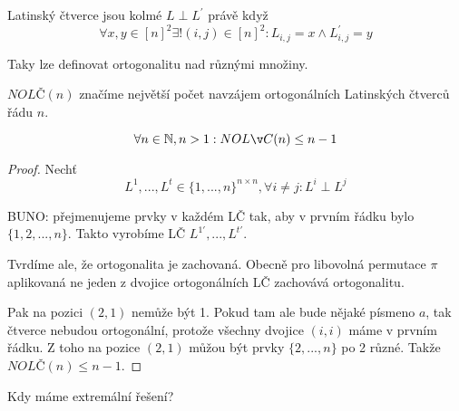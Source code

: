 \begin{definition}
	Latinský čtverce jsou kolmé $L \perp L^{\prime}$ právě když
	\[ \forall x,y \in [n]^2 \exists ! (i,j) \in [n]^2: L_{i,j} = x \land L_{i,j}^{\prime} = y \]

	Taky lze definovat ortogonalitu nad různými množiny.
\end{definition}

\begin{notation}
	$NOLČ(n)$ značíme největší počet navzájem ortogonálních Latinských čtverců řádu $n$.
\end{notation}

\begin{theorem}\label{nolc_lower0}
	\[\forall n \in \N, n > 1: NOLČ(n) \leq n - 1 \]
\end{theorem}
\begin{proof}
	Nechť
	\[L^1, ..., L^t \in \{ 1, ..., n \}^{n \times n}, \forall i \neq j: L^i \perp L^j \]

	BUNO: přejmenujeme prvky v každém LČ tak, aby v prvním řádku bylo $\{ 1, 2, ..., n \}$.
	Takto vyrobíme LČ $L^{1 \prime}, ..., L^{t \prime}$.

	Tvrdíme ale, že ortogonalita je zachovaná.
	Obecně pro libovolná permutace $\pi$ aplikovaná ne jeden z dvojice ortogonálních LČ zachovává ortogonalitu.

	Pak na pozici $(2,1)$ nemůže být 1.
	Pokud tam ale bude nějaké písmeno $a$, tak čtverce nebudou ortogonální, protože všechny dvojice $(i, i)$ máme v prvním řádku.
	Z toho na pozice $(2,1)$ můžou být prvky $\{ 2, ..., n \}$ po 2 různé.
	Takže $NOLČ(n) \leq n - 1 $.
\end{proof}

Kdy máme extremální řešení?

